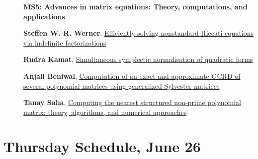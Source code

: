\documentclass[ILAS2025-program.tex]{subfiles}
\begin{document}
    \begin{description}
    \item[] {\color{mstitle}\textbf{MS5: Advances in matrix equations: Theory, computations, and applications}} 
    \item[] \hypertarget{up0363}{}\textbf{Steffen W. R. Werner}, \hyperlink{down0363}{Efficiently solving nonstandard Riccati equations via indefinite factorizations}
        \item[] \hypertarget{up0364}{}\textbf{Rudra Kamat}, \hyperlink{down0364}{Simultaneous symplectic normalisation of quadratic forms
}
        \item[] \hypertarget{up0365}{}\textbf{Anjali Beniwal}, \hyperlink{down0365}{Computation of an exact and approximate GCRD of several polynomial matrices using generalized Sylvester matrices}
        \item[] \hypertarget{up0366}{}\textbf{Tanay Saha}, \hyperlink{down0366}{Computing the nearest structured non-prime polynomial matrix: theory, algorithms, and numerical approaches}
        \end{description}
    \newpage

\section*{Thursday Schedule, June 26 }
        
\end{document}

